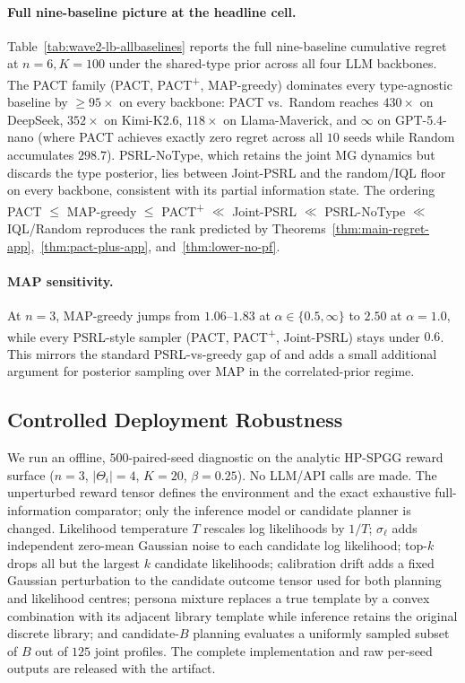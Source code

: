 \paragraph{Full nine-baseline picture at the headline cell.} Table~\ref{tab:wave2-lb-allbaselines} reports the full nine-baseline cumulative regret at $n{=}6, K{=}100$ under the shared-type prior across all four LLM backbones. The PACT family (PACT, PACT\textsuperscript{+}, MAP-greedy) dominates every type-agnostic baseline by $\geq\!95\times$ on every backbone: PACT vs.\ Random reaches $430\times$ on DeepSeek, $352\times$ on Kimi-K2.6, $118\times$ on Llama-Maverick, and $\infty$ on GPT-5.4-nano (where PACT achieves exactly zero regret across all $10$ seeds while Random accumulates $298.7$). PSRL-NoType, which retains the joint MG dynamics but discards the type posterior, lies between Joint-PSRL and the random/IQL floor on every backbone, consistent with its partial information state. The ordering PACT $\leq$ MAP-greedy $\leq$ PACT\textsuperscript{+} $\ll$ Joint-PSRL $\ll$ PSRL-NoType $\ll$ IQL/Random reproduces the rank predicted by Theorems~\ref{thm:main-regret-app},~\ref{thm:pact-plus-app}, and~\ref{thm:lower-no-pf}.

\paragraph{MAP sensitivity.} At $n{=}3$, MAP-greedy jumps from $1.06$--$1.83$ at $\alpha\in\{0.5,\infty\}$ to $2.50$ at $\alpha{=}1.0$, while every PSRL-style sampler (PACT, PACT\textsuperscript{+}, Joint-PSRL) stays under $0.6$. This mirrors the standard PSRL-vs-greedy gap of \citep{osband2013more} and adds a small additional argument for posterior sampling over MAP in the correlated-prior regime.

\subsection{Controlled Deployment Robustness}
\label{app:deployment-robustness}

We run an offline, $500$-paired-seed diagnostic on the analytic HP-SPGG reward surface ($n{=}3$, $|\Theta_i|{=}4$, $K{=}20$, $\beta{=}0.25$). No LLM/API calls are made. The unperturbed reward tensor defines the environment and the exact exhaustive full-information comparator; only the inference model or candidate planner is changed. Likelihood temperature $T$ rescales log likelihoods by $1/T$; $\sigma_\ell$ adds independent zero-mean Gaussian noise to each candidate log likelihood; top-$k$ drops all but the largest $k$ candidate likelihoods; calibration drift adds a fixed Gaussian perturbation to the candidate outcome tensor used for both planning and likelihood centres; persona mixture replaces a true template by a convex combination with its adjacent library template while inference retains the original discrete library; and candidate-$B$ planning evaluates a uniformly sampled subset of $B$ out of $125$ joint profiles. The complete implementation and raw per-seed outputs are released with the artifact.

